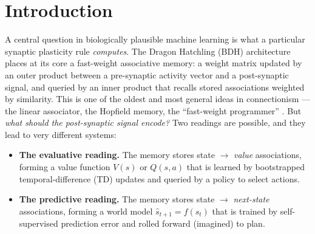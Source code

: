 \documentclass[11pt]{article}
\begin{document}
\begin{abstract}
{evasion in response to being caught} --- the optimal stationary estimator collapses and the
Hebbian rule beats it by up to nearly three-to-one, precisely because it keeps learning where RLS has
stopped. A final section closes the one remaining gap --- the no-learning velocity-lead baseline ---
by giving the Hebbian readout the \emph{bearing} to the pursuer (the argument of the reactive map)
and shortening the lead horizon to the velocity-decorrelation time; this reaches the reactive
frontier, beating every standard predictor while isolating the lead horizon, not the update rule,
as the binding constraint on reactive prey. Finally, we close the loop the paper's framing
implies: we replace the analytic lead with the Dreamer planning step itself --- receding-horizon
optimization \emph{inside} the learned world model (a ``world dreamer'') --- and show it beats the
analytic lead by up to $\sim\!40\%$ on predictable prey while remaining bounded, exactly as the
model is, by the predictability of the world. We
interpret the results as supporting a Dreamer-style division of
labor: fast-weight memories are best understood as \emph{predictive} substrates trained by
dense self-supervised error, with sparse, outcome-driven planning on top, rather than as
value-function approximators.
\end{abstract}

\section{Introduction}\label{sec:intro}

A central question in biologically plausible machine learning is what a particular synaptic
plasticity rule \emph{computes}. The Dragon Hatchling (BDH) architecture
\cite{bdh2025} places at its core a fast-weight associative memory: a weight matrix updated by
an outer product between a pre-synaptic activity vector and a post-synaptic signal, and
queried by an inner product that recalls stored associations weighted by similarity. This is
one of the oldest and most general ideas in connectionism --- the linear associator, the
Hopfield memory, the ``fast-weight programmer'' \cite{schmidhuber1992,schlag2021}. But
\emph{what should the post-synaptic signal encode?} Two readings are possible, and they lead
to very different systems:

\begin{itemize}
\item \textbf{The evaluative reading.} The memory stores state $\to$ \emph{value} associations,
  forming a value function $V(s)$ or $Q(s,a)$ that is learned by bootstrapped
  temporal-difference (TD) updates and queried by a policy to select actions.
\item \textbf{The predictive reading.} The memory stores state $\to$ \emph{next-state}
  associations, forming a world model $\hat{s}_{t+1} = f(s_t)$ that is trained by
  self-supervised prediction error and rolled forward (imagined) to plan.
\end{itemize}
\end{document}
